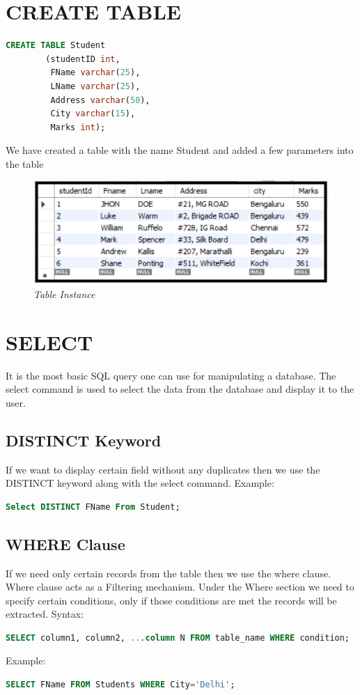\section{CREATE TABLE}
\begin{lstlisting}[language=sql]
	CREATE TABLE Student 
		(studentID int,
		 FName varchar(25),
		 LName varchar(25), 
		 Address varchar(50), 
		 City varchar(15), 
		 Marks int);
\end{lstlisting}
We have created a table with the name Student and added a few parameters into the table
\begin{figure}[h]
	\centering
	\includegraphics[width=0.85\linewidth]{img/a2}
	\caption{\textit{Table Instance}}
	\label{fig:create_table}
\end{figure}


\section{SELECT}
It is the most basic SQL query one can use for manipulating a database. The select command is used to select the data from the database and display it to the user.

\subsection{DISTINCT Keyword}
If we want to display certain field without any duplicates then we use the DISTINCT keyword along with the select command.
Example:
\begin{lstlisting}[language=sql]
	Select DISTINCT FName From Student;
\end{lstlisting}

\subsection{WHERE Clause}
If we need only certain records from the table then we use the where clause. Where clause acts as a Filtering mechanism. Under the Where section we need to specify certain conditions, only if those conditions are met the records will be extracted.
Syntax:
\begin{lstlisting}[language=sql]
	SELECT column1, column2, ...column N FROM table_name WHERE condition;
\end{lstlisting}
Example:
\begin{lstlisting}[language=sql]
	SELECT FName FROM Students WHERE City='Delhi';
\end{lstlisting}

